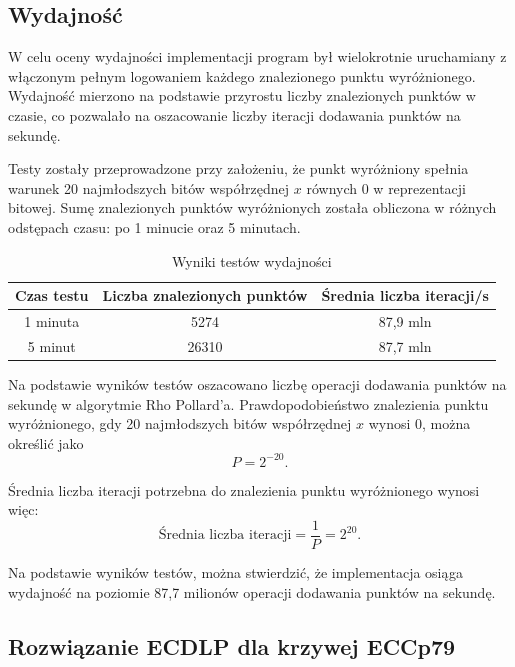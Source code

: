 \subsection{Wydajność}

W celu oceny wydajności implementacji program był wielokrotnie uruchamiany z
włączonym pełnym logowaniem każdego znalezionego punktu wyróżnionego. Wydajność
mierzono na podstawie przyrostu liczby znalezionych punktów w czasie, co pozwalało
na oszacowanie liczby iteracji dodawania punktów na sekundę.

Testy zostały przeprowadzone przy założeniu, że punkt wyróżniony spełnia warunek 20
najmłodszych bitów współrzędnej $x$ równych $0$ w reprezentacji bitowej.
Sumę znalezionych punktów wyróżnionych została obliczona w różnych odstępach czasu:
po 1 minucie oraz 5 minutach.

\begin{table}[h!]
    \centering
    \caption{Wyniki testów wydajności}
    \begin{tabular}{|c|c|c|}
        \hline
        \textbf{Czas testu} & \textbf{Liczba znalezionych punktów} &
        \textbf{Średnia liczba iteracji/s}                                    \\ \hline
        1 minuta            & 5274                                 & 87,9 mln \\ \hline
        5 minut             & 26310                                & 87,7 mln \\ \hline
    \end{tabular}
    \label{tab:performance}
\end{table}

Na podstawie wyników testów oszacowano liczbę operacji dodawania punktów na
sekundę w algorytmie Rho Pollard'a. Prawdopodobieństwo znalezienia punktu wyróżnionego,
gdy 20 najmłodszych bitów współrzędnej $x$ wynosi $0$, można określić jako
$$
    P = 2^{-20}.
$$

Średnia liczba iteracji potrzebna do znalezienia punktu wyróżnionego wynosi
więc:
$$
    \text{Średnia liczba iteracji} = \frac{1}{P} = 2^{20}.
$$

Na podstawie wyników testów, można stwierdzić, że implementacja osiąga wydajność na
poziomie 87,7 milionów operacji dodawania punktów na sekundę.

\newpage
\subsection{Rozwiązanie ECDLP dla krzywej ECCp79}

